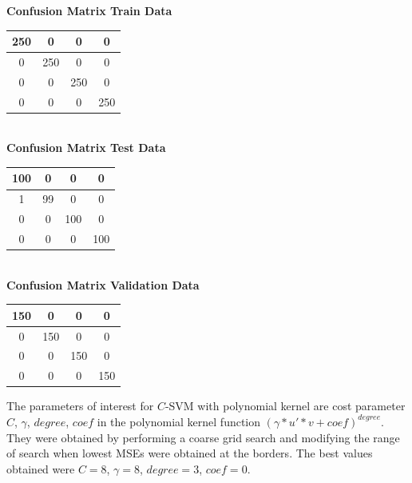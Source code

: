 \documentclass{article}
\begin{document}
\begin{flushleft}
\textbf{Confusion Matrix Train Data\\[5pt]}
\begin{tabular}{|c|c|c|c|}
\hline
250 & 0 & 0 & 0 \\
\hline
0 & 250 & 0 & 0 \\
\hline
0 & 0 & 250 & 0 \\
\hline
0 & 0 & 0 & 250 \\
\hline
\end{tabular}
\textbf{\\[10pt] Confusion Matrix Test Data \\[5pt]}
\begin{tabular}{|c|c|c|c|}
\hline
100 & 0 & 0 & 0 \\
\hline
1 & 99 & 0 & 0 \\
\hline
0 & 0 & 100 & 0 \\
\hline
0 & 0 & 0 & 100 \\
\hline
\end{tabular}
\textbf{\\[10pt] Confusion Matrix Validation Data \\[5pt]}
\begin{tabular}{|c|c|c|c|}
\hline
150 & 0 & 0 & 0 \\
\hline
0 & 150 & 0 & 0 \\
\hline
0 & 0 & 150 & 0 \\
\hline
0 & 0 & 0 & 150 \\
\hline
\end{tabular}
\end{flushleft}

The parameters of interest for $C$-SVM with polynomial kernel are cost parameter $C$, $\gamma$, $degree$, $coef$ in the polynomial kernel function $(\gamma*u'*v+coef)^{degree}$. They were obtained by performing a coarse grid search and modifying the range of search when lowest MSEs were obtained at the borders.
The best values obtained were $C=8$, $\gamma=8$, $degree=3$, $coef=0$.
\end{document}
